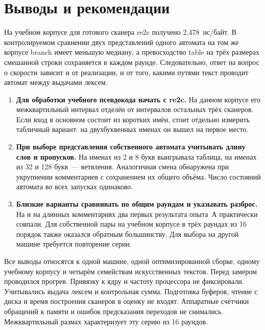 \nextpage
\section*{Выводы и рекомендации}
На учебном корпусе для готового сканера re2c получено 2,478~нс/байт. В контролируемом сравнении двух представлений одного автомата на том же корпусе branch имеет меньшую медиану, а превосходство table на трёх размерах смешанной строки сохраняется в каждом раунде. Следовательно, ответ на вопрос о скорости зависит и от реализации, и от того, какими путями текст проводит автомат между выдачами лексем.

\begin{enumerate}
\item \textbf{Для обработки учебного псевдокода начать с re2c.}
На данном корпусе его межквартильный интервал отделён от интервалов остальных трёх сканеров. Если вход в основном состоит из коротких имён, стоит отдельно измерить табличный вариант: на двухбуквенных именах он вышел на первое место.
\item \textbf{При выборе представления собственного автомата учитывать длину слов и пропусков.}
На именах из 2 и 8 букв выигрывала таблица, на именах из 32 и 128 букв~--- ветвления. Аналогичная смена обнаружена при укрупнении комментариев с сохранением их общего объёма. Число состояний автомата во всех запусках одинаково.
\item \textbf{Близкие варианты сравнивать по общим раундам и указывать разброс.}
На  и на длинных комментариях два первых результата опыта~А практически совпали. Для собственной пары на учебном корпусе в трёх раундах из 16 порядок также оказался обратным большинству. Для выбора на другой машине требуется повторение серии.
\end{enumerate}

Все выводы относятся к одной машине, одной оптимизированной сборке, одному учебному корпусу и четырём семействам искусственных текстов. Перед замером проводился прогрев. Привязку к ядру и частоту процессора не фиксировали. Учитывались выдача лексем и контрольная сумма. Подготовка буферов, чтение с диска и время построения сканеров в оценку не входят. Аппаратные счётчики обращений к памяти и ошибок предсказания переходов не снимались. Межквартильный размах характеризует эту серию из 16 раундов.


